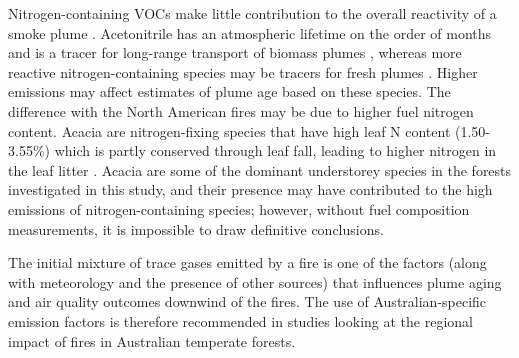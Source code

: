 \documentclass[acp, manuscript]{copernicus}
\begin{document}
Nitrogen-containing VOCs make little contribution to the overall reactivity of a smoke plume \citep{Gilman2015}. Acetonitrile has an atmospheric lifetime on the order of months and is a tracer for long-range transport of biomass plumes \citep{Bange2000}, whereas more reactive nitrogen-containing species may be tracers for fresh plumes \citep{Gilman2015,Coggon2016}. Higher emissions may affect estimates of plume age based on these species. 
The difference with the North American fires may be due to higher fuel nitrogen content. Acacia are nitrogen-fixing species that have high leaf N content (1.50-3.55$\%$) which is partly conserved through leaf fall, leading to higher nitrogen in the leaf litter \citep{Snowdon2005}. Acacia are some of the dominant understorey species in the forests investigated in this study, and their presence may have contributed to the high emissions of nitrogen-containing species; however, without fuel composition measurements, it is impossible to draw definitive conclusions. 

The initial mixture of trace gases emitted by a fire is one of the factors (along with meteorology and the presence of other sources) that influences plume aging \citep{Akagi2012,Jaffe2012} and air quality outcomes downwind of the fires.  
The use of Australian-specific emission factors is therefore recommended in studies looking at the regional impact of fires in Australian temperate forests. 
\end{document}
